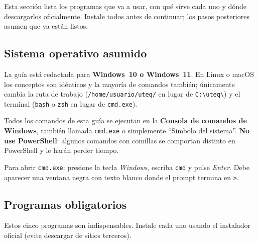 \documentclass[11pt,a4paper]{article}
\begin{document}
Esta secci\'on lista los programas que va a usar, con qu\'e sirve cada uno y d\'onde descargarlos oficialmente. Instale todos antes de continuar; los pasos posteriores asumen que ya est\'an listos.

\subsection{Sistema operativo asumido}

La gu\'ia est\'a redactada para \textbf{Windows~10 o Windows~11}. En Linux o macOS los conceptos son id\'enticos y la mayor\'ia de comandos tambi\'en; \'unicamente cambia la ruta de trabajo (\texttt{/home/usuario/uteq/} en lugar de \texttt{C:\textbackslash uteq\textbackslash}) y el terminal (\texttt{bash} o \texttt{zsh} en lugar de \texttt{cmd.exe}).

Todos los comandos de esta gu\'ia se ejecutan en la \textbf{Consola de comandos de Windows}, tambi\'en llamada \texttt{cmd.exe} o simplemente ``Simbolo del sistema''. \textbf{No use PowerShell}: algunos comandos con comillas se comportan distinto en PowerShell y le har\'an perder tiempo.

Para abrir \texttt{cmd.exe}: presione la tecla \emph{Windows}, escriba \texttt{cmd} y pulse \emph{Enter}. Debe aparecer una ventana negra con texto blanco donde el prompt termina en \texttt{>}.

\subsection{Programas obligatorios}

Estos cinco programas son indispensables. Instale cada uno usando el instalador oficial (evite descargar de sitios terceros).
\end{document}
